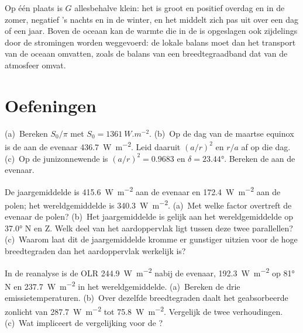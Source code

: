 \begin{remark}\label{rem:b1:radiation-heat-transport:local}
Op één plaats is $G$ allesbehalve klein: het is groot en positief overdag en in de zomer, negatief 's nachts en in de winter, en het middelt zich pas uit over een dag of een jaar. Boven de oceaan kan de warmte die in de  is opgeslagen ook zijdelings door de stromingen worden weggevoerd: de lokale balans moet dan het transport van de oceaan omvatten, zoals de balans van een breedtegraadband dat van de atmosfeer omvat.
\end{remark}

\section{Oefeningen}

\begin{exercise}[$\star$]\label{exo:b1:radiation-heat-transport:1}
(a)~Bereken $S_0/\pi$ met $S_0 = \qty{1361}{W.m^{-2}}$. (b)~Op de dag van de maartse equinox is de  aan de evenaar \qty{436.7}{W.m^{-2}}. Leid daaruit $(a/r)^2$ en $r/a$ af op die dag. (c)~Op de junizonnewende is $(a/r)^2 = 0.9683$ en $\delta = \ang{23.44}$. Bereken de  aan de evenaar.
\end{exercise}

\begin{exercise}[$\star$]\label{exo:b1:radiation-heat-transport:2}
De jaargemiddelde  is \qty{415.6}{W.m^{-2}} aan de evenaar en \qty{172.4}{W.m^{-2}} aan de polen; het wereldgemiddelde is \qty{340.3}{W.m^{-2}}. (a)~Met welke factor overtreft de evenaar de polen? (b)~Het jaargemiddelde is gelijk aan het wereldgemiddelde op \ang{37.0} N en Z. Welk deel van het aardoppervlak ligt tussen deze twee parallellen? (c)~Waarom laat dit de jaargemiddelde kromme er gunstiger uitzien voor de hoge breedtegraden dan het aardoppervlak werkelijk is?
\end{exercise}

\begin{exercise}[$\star$]\label{exo:b1:radiation-heat-transport:3}
In de reanalyse is de OLR \qty{244.9}{W.m^{-2}} nabij de evenaar, \qty{192.3}{W.m^{-2}} op \ang{81} N en \qty{237.7}{W.m^{-2}} in het wereldgemiddelde. (a)~Bereken de drie emissietemperaturen. (b)~Over dezelfde breedtegraden daalt het geabsorbeerde zonlicht van \qty{287.7}{W.m^{-2}} tot \qty{75.8}{W.m^{-2}}. Vergelijk de twee verhoudingen. (c)~Wat impliceert de vergelijking voor de ?
\end{exercise}

